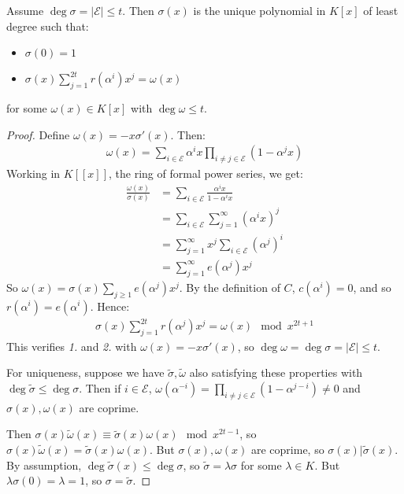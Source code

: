 \documentclass[10pt,a4paper]{article}
\begin{document}
\begin{theorem}
Assume $\deg \sigma = |\mathcal{E}| \leq t$. Then $\sigma(x)$ is the unique polynomial in $K[x]$ of least degree such that:
\begin{itemize}
\item $\sigma(0) = 1$
\item $\sigma(x) \sum_{j=1}^{2t} r(\alpha^i)x^j = \omega(x)$
\end{itemize}
for some $\omega(x) \in K[x]$ with $\deg \omega \leq t$.
\end{theorem}
\begin{proof}
Define $\omega(x) = -x\sigma'(x)$. Then:
\begin{align*}
\omega(x) = \sum_{i\in \mathcal{E}}\alpha^i x\prod_{i \neq j \in \mathcal{E}}(1-\alpha^j x)
\end{align*}
Working in $K[[x]]$, the ring of formal power series, we get:
\begin{align*}
\frac{\omega(x)}{\sigma(x)} &= \sum_{i \in \mathcal{E}}\frac{\alpha^i x}{1-\alpha^i x} \\
&= \sum_{i \in \mathcal{E}}\sum_{j=1}^\infty (\alpha^i x)^j\\
&= \sum_{j=1}^\infty x^j \sum_{i \in \mathcal{E}} (\alpha^j)^i\\
&= \sum_{j=1}^\infty e(\alpha^j) x^j
\end{align*}
So $\omega(x) = \sigma(x)\sum_{j\geq 1} e(\alpha^j)x^j$. By the definition of $C$, $c(\alpha^i) = 0$, and so $r(\alpha^i) = e(\alpha^i)$. Hence:
\begin{align*}
\sigma(x)\sum_{j=1}^{2t} r(\alpha^j)x^j = \omega(x) \mod x^{2t+1}
\end{align*}
This verifies \textit{1.} and \textit{2.} with $\omega(x) = -x\sigma'(x)$, so $\deg \omega =\deg \sigma =|\mathcal{E}| \leq t$. 

For uniqueness, suppose we have $\tilde{\sigma}, \tilde{\omega}$ also satisfying these properties with $\deg \tilde{\sigma} \leq \deg\sigma$. Then if $i \in \mathcal{E}$, $\omega(\alpha^{-i}) = \prod_{i\neq j\in\mathcal{E}} (1-\alpha^{j-i}) \neq 0$ and $\sigma(x), \omega(x)$ are coprime.

Then $\sigma(x)\tilde{\omega}(x) \equiv \tilde{\sigma}(x)\omega(x) \mod x^{2t-1}$, so $\sigma(x)\tilde{\omega}(x) = \tilde{\sigma}(x)\omega(x)$. But $\sigma(x), \omega(x)$ are coprime, so $\sigma(x)|\tilde{\sigma}(x)$. By assumption, $\deg\tilde{\sigma}(x) \leq \deg \sigma$, so $\tilde{\sigma} = \lambda \sigma$ for some $\lambda \in K$. But $\lambda \sigma(0) = \lambda = 1$, so $\sigma = \tilde{\sigma}$.
\end{proof}
\end{document}
